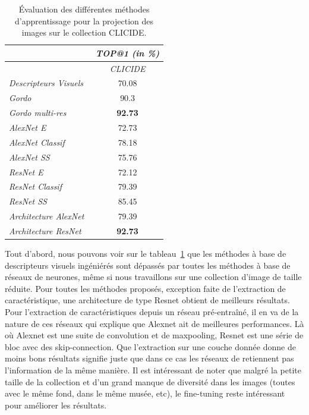 \begin{table}
\centering
\begin{tabular}{|l|c|}
\hline & {\emph{TOP@1 (in \%)}}\\
\hline & \emph{CLICIDE}\\
\hline \emph{Descripteurs Visuels~\cite{portaz2017construction}} & 70.08\\
\hline \emph{Gordo~\cite{gordo2016deep}} & 90.3 \\
\hline \emph{Gordo multi-res~\cite{gordo2016deep}} & \textbf{92.73} \\
\hline \emph{AlexNet E} & 72.73 \\
\hline \emph{AlexNet Classif} & 78.18 \\
\hline \emph{AlexNet SS} & 75.76 \\
\hline \emph{ResNet E} & 72.12 \\
\hline \emph{ResNet Classif} & 79.39 \\
\hline \emph{ResNet SS} & 85.45 \\
\hline \emph{Architecture AlexNet} & 79.39\\
\hline \emph{Architecture ResNet} & \textbf{92.73}\\
\hline
\end{tabular}
\caption{Évaluation des différentes méthodes d’apprentissage pour la projection des images sur le collection CLICIDE.
\label{tab:resultatssansregion}}
\end{table}

Tout d'abord, nous pouvons voir sur le tableau~\ref{tab:resultatssansregion} que les méthodes à base de descripteurs visuels ingéniérés sont dépassés par toutes les méthodes à base de réseaux de neurones, même si nous travaillons sur une collection d'image de taille réduite. Pour toutes les méthodes proposés, exception faite de l'extraction de caractéristique, une architecture de type Resnet obtient de meilleurs résultats. Pour l'extraction de caractéristiques depuis un réseau pré-entraîné, il en va de la nature de ces réseaux qui explique que Alexnet ait de meilleures performances. Là où Alexnet est une suite de convolution et de maxpooling, Resnet est une série de bloc avec des skip-connection. Que l'extraction sur une couche donnée donne de moins bons résultats signifie juste que dans ce cas les réseaux de retiennent pas l'information de la même manière. Il est intéressant de noter que malgré la petite taille de la collection et d'un grand manque de diversité dans les images (toutes avec le même fond, dans le même musée, etc), le fine-tuning reste intéressant pour améliorer les résultats.

